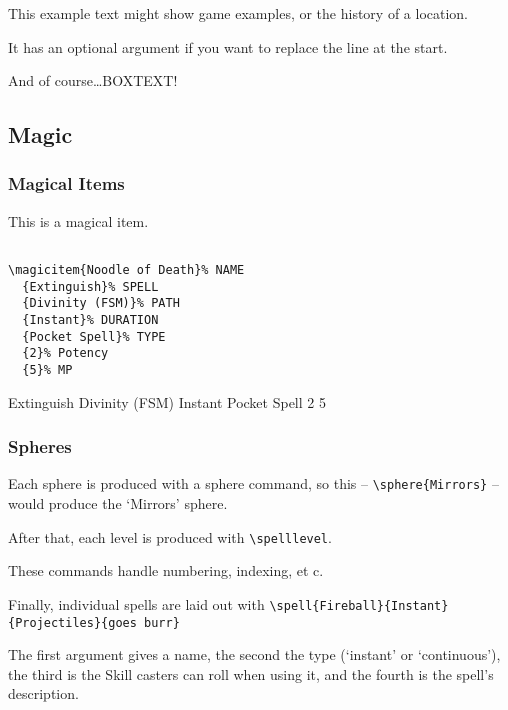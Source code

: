 \documentclass[a4paper,openany]{book}
\begin{document}
\begin{multicols}{2}
\begin{exampletext}
  This example text might show game examples, or the history of a location.

  It has an optional argument if you want to replace the line at the start.

\end{exampletext}

\begin{boxtext}
  And of course\ldots BOXTEXT!

\end{boxtext}

\subsection{Magic}

\subsubsection{Magical Items}

This is a magical item.

\begin{verbatim}

\magicitem{Noodle of Death}% NAME
  {Extinguish}% SPELL
  {Divinity (FSM)}% PATH
  {Instant}% DURATION
  {Pocket Spell}% TYPE
  {2}% Potency
  {5}% MP

\end{verbatim}

  {Extinguish}%
  {Divinity (FSM)}%
  {Instant}%
  {Pocket Spell}%
  {2}%
  {5}%

\subsubsection{Spheres}

Each sphere is produced with a sphere command, so this -- \verb"\sphere{Mirrors}" -- would produce the `Mirrors' sphere.

After that, each level is produced with \verb"\spelllevel".

These commands handle numbering, indexing, et c.

Finally, individual spells are laid out with \verb"\spell{Fireball}{Instant}{Projectiles}{goes burr}"

The first argument gives a name, the second the type (`instant' or `continuous'), the third is the Skill casters can roll when using it, and the fourth is the spell's description.


\end{multicols}
\end{document}
